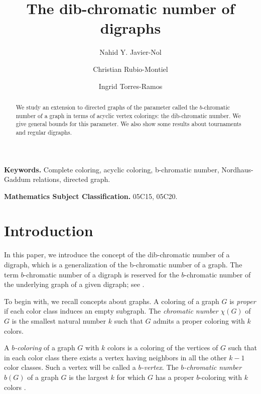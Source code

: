 \documentclass[12pt]{article}
\title{The dib-chromatic number of digraphs}
\author{Nahid Y. Javier-Nol\footnotemark[2] \and  Christian Rubio-Montiel\footnotemark[3] \and Ingrid Torres-Ramos\footnotemark[3]}
\begin{document}
\maketitle

\def\thefootnote{\fnsymbol{footnote}}

\begin{abstract}
We study an extension to directed graphs of the parameter called the $b$-chromatic number of a graph in terms of acyclic vertex colorings: the dib-chromatic number. We give general bounds for this parameter. We also show some results about tournaments and regular digraphs.
\end{abstract}
\textbf{Keywords.} Complete coloring, acyclic coloring, b-chromatic number, Nordhaus-Gaddum relations, directed graph.

\textbf{Mathematics Subject Classification.} 05C15, 05C20.


\section{Introduction}

In this paper, we introduce the concept of the dib-chromatic number of a digraph, which is a generalization of the b-chromatic number of a graph. The term $b$-chromatic number of a digraph is reserved for the $b$-chromatic number of the underlying graph of a given digraph; see \cite{MR3511873}.

To begin with, we recall concepts about graphs. A coloring of a graph $G$ is \emph{proper} if each color class induces an empty subgraph. The \emph{chromatic number} $\chi(G)$ of $G$ is the smallest natural number $k$ such that $G$ admits a proper coloring with $k$ colors.

A \emph{$b$-coloring} of a graph $G$ with $k$ colors is a coloring of the vertices of $G$ such that in each color class there exists a vertex having neighbors in all the other $k-1$ color classes. Such a vertex will be called a \emph{$b$-vertex}. The \emph{$b$-chromatic number} $b(G)$ of a graph $G$ is the largest $k$ for which $G$ has a proper $b$-coloring with $k$ colors \cite{MR1670155}.
\end{document}
